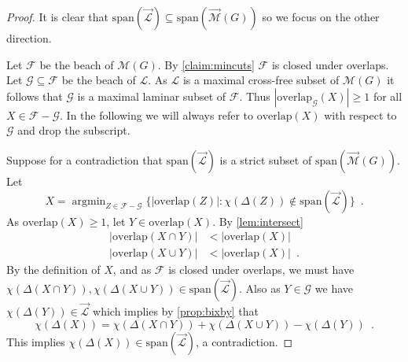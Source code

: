 \documentclass[10pt,a4paper]{article}
\newcommand{\Lcal}{\mathcal{L}}
\newcommand{\Mcal}{\mathcal{M}}
\newcommand{\M}{\mathcal{M}}
\newcommand{\Fcal}{\mathcal{F}}
\newcommand{\Gcal}{\mathcal{G}}
\DeclareMathOperator*{\argmin}{argmin}
\newcommand{\laspan}{\mathrm{span}}
\newcommand{\cross}{\mathrm{overlap}}
\newcommand{\1}{\mathbf{1}}
\theoremstyle{definition}
\begin{document}
\begin{proof}
It is clear that $\laspan(\vec{\Lcal}) \subseteq \laspan(\vec{\M}(G))$ so we focus on the other direction.

Let $\Fcal$ be the beach of $\M(G)$.  By \cref{claim:mincuts} $\Fcal$ is closed under overlaps.  Let $\Gcal \subseteq \Fcal$ be the beach of $\Lcal$.  As $\Lcal$ is a
maximal cross-free subset of $\M(G)$ it follows that $\Gcal$ is a maximal laminar subset of $\Fcal$.
Thus $|\cross_{\Gcal}(X)| \ge 1$ for all $X \in \Fcal - \Gcal$.  In the following we will always refer to $\cross(X)$ with respect to $\Gcal$ and drop the subscript.

Suppose for a contradiction that $\laspan(\vec{\Lcal}) $ is a strict subset of
$\laspan(\vec{\Mcal}(G))$.  Let
\[
X = \argmin_{Z \in \Fcal - \Gcal} \{ |\cross(Z) |:  \chi(\Delta(Z)) \not \in  \laspan(\vec{\Lcal}) \} \enspace .
\]
As $\cross(X) \ge 1$, let $Y \in \cross(X)$.  By \cref{lem:intersect}
\begin{align}
\label{eq:card_cap}
|\cross(X \cap Y)| &< |\cross(X)| \\
\label{eq:card_cup}
|\cross(X \cup Y)| &< |\cross(X)| \enspace .
\end{align}
By the definition of $X$, and as $\Fcal$ is closed under overlaps, we must have
$\chi(\Delta(X \cap Y)), \chi(\Delta(X \cup Y)) \in \laspan(\vec{\Lcal})$.
Also as $Y \in \Gcal$ we have $\chi(\Delta(Y)) \in \vec{\Lcal}$ which implies by \cref{prop:bixby} that
\[
\chi(\Delta(X)) =  \chi(\Delta(X \cap Y))+ \chi(\Delta(X \cup Y)) - \chi(\Delta(Y)) \enspace.
\]
This implies $\chi(\Delta(X)) \in \laspan(\vec{\Lcal})$, a contradiction.
\end{proof}
\end{document}
